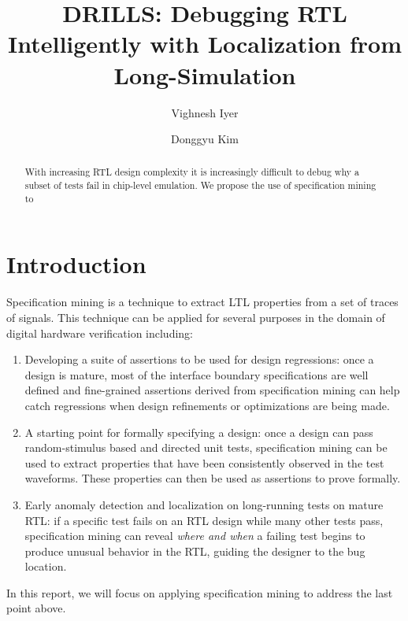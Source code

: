 \documentclass[acmlarge,11pt]{acmart}
\begin{document}
\title{DRILLS: Debugging RTL Intelligently with Localization from Long-Simulation}
\author{Vighnesh Iyer}
\author{Donggyu Kim}
\renewcommand{\shortauthors}{Iyer and Kim}

\begin{abstract}
  With increasing RTL design complexity it is increasingly difficult to debug why a subset of tests fail in chip-level emulation.
  We propose the use of specification mining to
\end{abstract}
\maketitle
\thispagestyle{empty}
\section{Introduction}
Specification mining is a technique to extract LTL properties from a set of traces of signals.
This technique can be applied for several purposes in the domain of digital hardware verification including:
\begin{enumerate}
  \item Developing a suite of assertions to be used for design regressions: once a design is mature, most of the interface boundary specifications are well defined and fine-grained assertions derived from specification mining can help catch regressions when design refinements or optimizations are being made.
  \item A starting point for formally specifying a design: once a design can pass random-stimulus based and directed unit tests, specification mining can be used to extract properties that have been consistently observed in the test waveforms. These properties can then be used as assertions to prove formally.
  \item Early anomaly detection and localization on long-running tests on mature RTL: if a specific test fails on an RTL design while many other tests pass, specification mining can reveal \textit{where and when} a failing test begins to produce unusual behavior in the RTL, guiding the designer to the bug location.
\end{enumerate}
In this report, we will focus on applying specification mining to address the last point above.
\end{document}
